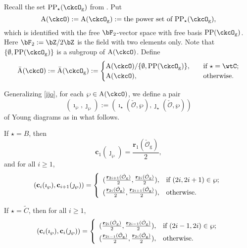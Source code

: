 \documentclass[12pt,a4paper]{amsart}
\newcommand{\CO}{{\mathcal {O}}}
\numberwithin{equation}{section}
\theoremstyle{remark}
\def\CPP{\mathrm{PP}}
\def\CPPs{\mathrm{PP}_{\star}}
\begin{document}
Recall the set  $\CPPs(\ckcO_{\mathrm g})$ from   .   Put
  \[
    {\mathrm A}(\ckcO) := {\mathrm A}(\ckcO_{\mathrm g}):= \textrm{the power set of $\CPPs(\ckcO_{\mathrm g})$},
    \]
    which is identified with the free $\bF_2$-vector space with free basis $\CPP(\ckcO_{\mathrm g})$. Here $\bF_{2}:=\bZ/2\bZ$ is the field with two elements only.
Note that   $\{\emptyset, \CPP(\ckcO_{\mathrm g})\}$ is a subgroup of ${\mathrm A}(\ckcO)$.  Define
   \begin{equation*}%
  \bar{\mathrm A}(\ckcO):= \bar{\mathrm A}(\ckcO_{\mathrm g}):=
  \begin{cases}
 {\mathrm A}(\ckcO)/\{\emptyset, \CPP(\ckcO_{\mathrm g})\}, & \quad \text{if  } \star =\wtC;\\
 {\mathrm A}(\ckcO),  & \quad \text{otherwise.}
  \end{cases}
  \end{equation*}

  Generalizing \eqref{ijo}, for each $\wp\in  {\mathrm A}(\ckcO)$,    we define a pair \[
(\imath_\wp, \jmath_\wp):=(\imath_\star(\check \CO, \wp), \jmath_\star(\check \CO, \wp))
\]
 of Young diagrams  as in what follows.

If $\star=B$, then
 \[
   \mathbf c_{1}(\jmath_\wp)=\frac{\mathbf r_1(\check \CO_{\mathrm g})}{2},
\]
and for all $i\geq 1$,
\[
(\mathbf c_{i}(\imath_\wp), \mathbf c_{i+1}(\jmath_\wp))=
   \left\{
     \begin{array}{ll}
           (\frac{\mathbf r_{2i+1}(\check \CO_{\mathrm g})}{2},  \frac{\mathbf r_{2i}(\check \CO_{\mathrm g})}{2}), &\hbox{if $(2i, 2i+1)\in \wp$}; \smallskip\\
            (\frac{\mathbf r_{2i}(\check \CO_{\mathrm g})}{2},  \frac{\mathbf r_{2i+1}(\check \CO_{\mathrm g})}{2}), &\hbox{otherwise}.\\
            \end{array}
   \right.
\]


If $\star=\widetilde{C}$, then for all $i\geq 1$,
\[
(\mathbf c_{i}(\imath_\wp), \mathbf c_{i}(\jmath_\wp))=
   \left\{
     \begin{array}{ll}
           (\frac{\mathbf r_{2i}(\check \CO_{\mathrm g})}{2},  \frac{\mathbf r_{2i-1}(\check \CO_{\mathrm g})}{2}), &\hbox{if $(2i-1, 2i)\in \wp$}; \smallskip\\
            (\frac{\mathbf r_{2i-1}(\check \CO_{\mathrm g})}{2},  \frac{\mathbf r_{2i}(\check \CO_{\mathrm g})}{2}), &\hbox{otherwise}.\\
            \end{array}
   \right.
\]
\end{document}
